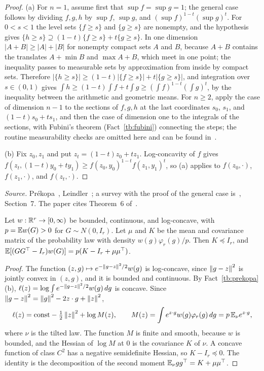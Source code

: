 \begin{proof}
(a) For \(n=1\), assume first that \(\sup f=\sup g=1\); the general case
follows by dividing \(f,g,h\) by \(\sup f\), \(\sup g\), and
\((\sup f)^{1-t}(\sup g)^t\). For \(0<s<1\) the level sets
\(\{f\ge s\}\) and \(\{g\ge s\}\) are nonempty, and the hypothesis gives
\(\{h\ge s\}\supseteq(1-t)\{f\ge s\}+t\{g\ge s\}\). In one dimension
\(|A+B|\ge|A|+|B|\) for nonempty compact sets \(A\) and \(B\), because
\(A+B\) contains the translates \(A+\min B\) and \(\max A+B\), which meet in
one point; the inequality passes to measurable sets by approximation from
inside by compact sets. Therefore
\(|\{h\ge s\}|\ge(1-t)|\{f\ge s\}|+t|\{g\ge s\}|\), and integration over
\(s\in(0,1)\) gives \(\int h\ge(1-t)\int f+t\int g\ge(\int f)^{1-t}(\int g)^t\),
by the inequality between the arithmetic and geometric means. For \(n\ge2\),
apply the case of dimension \(n-1\) to the sections of \(f,g,h\) at the last
coordinates \(s_0\), \(s_1\), and \((1-t)s_0+ts_1\), and then the case of
dimension one to the integrals of the sections, with Fubini's theorem
(Fact~\ref{tb:fubini}) connecting the steps; the routine measurability
checks are omitted here and can be found in~.

(b) Fix \(z_0,z_1\) and put \(z_t=(1-t)z_0+tz_1\). Log-concavity of \(f\)
gives \(f(z_t,(1-t)y_0+ty_1)\ge f(z_0,y_0)^{1-t}f(z_1,y_1)^t\), so (a) applies
to \(f(z_0,\cdot)\), \(f(z_1,\cdot)\), and \(f(z_t,\cdot)\).
\end{proof}

\emph{Source.} Pr\'ekopa~, Leindler~; a
survey with the proof of the general case is~, Section~7. The
paper cites Theorem~6 of~.

\begin{fact}\label{tb:tilt}
Let \(w:\mathbb R^r\to[0,\infty)\) be bounded, continuous, and log-concave, with
\(p=\mathbb E w(G)>0\) for \(G\sim N(0,I_r)\). Let \(\mu\) and \(K\) be the mean and
covariance matrix of the probability law with density \(w(g)\varphi_r(g)/p\).
Then \(K\preceq I_r\), and
\(\mathbb E[(GG^\top-I_r)w(G)]=p(K-I_r+\mu\mu^\top)\).
\end{fact}

\begin{proof}
The function \((z,g)\mapsto e^{-\left\lVert g-z\right\rVert^2/2}w(g)\) is log-concave, since
\(\left\lVert g-z\right\rVert^2\) is jointly convex in \((z,g)\), and it is bounded and
continuous. By Fact~\ref{tb:prekopa}(b), \(\ell(z)=\log\int e^{-\left\lVert g-z\right\rVert^2/2}
w(g)\,dg\) is concave. Since \(\left\lVert g-z\right\rVert^2=\left\lVert g\right\rVert^2-2z\cdot g+\left\lVert z\right\rVert^2\),
\[
 \ell(z)=\text{const}-\tfrac12\left\lVert z\right\rVert^2+\log M(z),\qquad
 M(z)=\int e^{z\cdot g}w(g)\varphi_r(g)\,dg=p\,\mathbb E_\nu e^{z\cdot g},
\]
where \(\nu\) is the tilted law. The function \(M\) is finite and smooth,
because \(w\) is bounded, and the Hessian of \(\log M\) at \(0\) is the
covariance \(K\) of \(\nu\). A concave function of class \(C^2\) has a
negative semidefinite Hessian, so \(K-I_r\preceq0\). The identity is the
decomposition of the second moment \(\mathbb E_\nu gg^\top=K+\mu\mu^\top\).
\end{proof}


